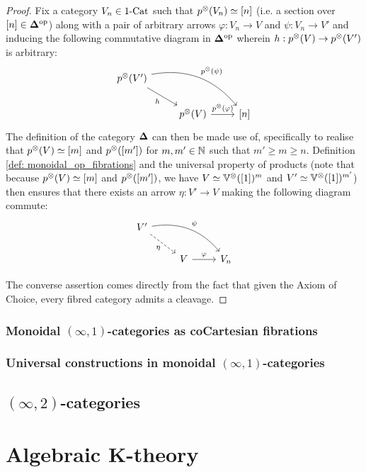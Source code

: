                     \begin{proof}
                        Fix a category $V_n \in 1\text{-}\mathrm{Cat}$ such that $p^{\tensor}(V_n) \cong [n]$ (i.e. a section over $[n] \in \mathbf{\Delta}^{\mathrm{op}}$) along with a pair of arbitrary arrows $\varphi: V_n \to V$ and $\psi: V_n \to V'$ and inducing the following commutative diagram in $\mathbf{\Delta}^{\mathrm{op}}$ wherein $h: p^{\tensor}(V) \to p^{\tensor}(V')$ is arbitrary:
                            $$
                                \begin{tikzcd}
                                    p^{\tensor}(V') \arrow[rd, "h"'] \arrow[rrd, "p^{\tensor}(\psi)", bend left] &                                                  &       \\
                                                                                                                 & p^{\tensor}(V) \arrow[r, "p^{\tensor}(\varphi)"] & {[n]}
                                \end{tikzcd}
                            $$
                        The definition of the category $\mathbf{\Delta}$ can then be made use of, specifically to realise that $p^{\tensor}(V) \cong [m]$ and $p^{\tensor}([m'])$ for $m, m' \in \mathbb{N}$ such that $m' \geq m \geq n$. Definition \ref{def: monoidal_op_fibrations} and the universal property of products (note that because $p^{\tensor}(V) \cong [m]$ and $p^{\tensor}([m'])$, we have $V \cong \V^{\tensor}([1])^m$ and $V' \cong \V^{\tensor}([1])^{m'}$) then ensures that there exists an arrow $\eta: V' \to V$ making the following diagram commute:
                            $$
                                \begin{tikzcd}
                                    V' \arrow[rd, "\eta"', dashed] \arrow[rrd, "\psi", bend left] &                                                  &       \\
                                                                                                                 & V \arrow[r, "\varphi"] & {V_n}
                                \end{tikzcd}
                            $$
                            
                        The converse assertion comes directly from the fact that given the Axiom of Choice, every fibred category admits a cleavage.
                    \end{proof}
                
            \subsubsection{Monoidal \texorpdfstring{$(\infty, 1)$}{}-categories as coCartesian fibrations}
            
            \subsubsection{Universal constructions in monoidal \texorpdfstring{$(\infty, 1)$}{}-categories}
        
        \subsection{\texorpdfstring{$(\infty, 2)$}{}-categories}
        
    \section{Algebraic K-theory}